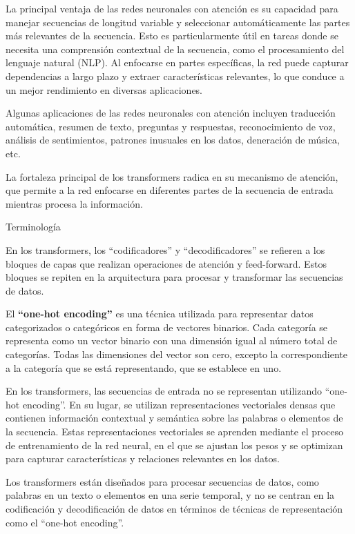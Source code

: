 \documentclass[10pd,hyperref={colorlinks=true}]{beamer}
\begin{document}

 \begin{frame}{}

La principal ventaja de las redes neuronales con atención es su 
capacidad para manejar secuencias de longitud variable y seleccionar 
automáticamente las partes más relevantes de la secuencia. Esto es 
particularmente útil en tareas donde se necesita una comprensión 
contextual de la secuencia, como el procesamiento del lenguaje natural 
(NLP). Al enfocarse en partes específicas, la red puede capturar 
dependencias a largo plazo y extraer características relevantes, lo que 
conduce a un mejor rendimiento en diversas aplicaciones.

Algunas aplicaciones de las redes neuronales con atención incluyen 
traducción automática, resumen de texto, preguntas y respuestas, 
reconocimiento de voz, análisis de sentimientos, patrones inusuales en 
los datos, deneración de música, etc.

La fortaleza principal de los transformers radica en su mecanismo de 
atención, que permite a la red enfocarse en diferentes partes de la 
secuencia de entrada mientras procesa la información. 

 \end{frame}


 \begin{frame}{Terminología}

En los transformers, los ``codificadores'' y ``decodificadores'' se 
refieren a los bloques de capas que realizan operaciones de atención y 
feed-forward. Estos bloques se repiten en la arquitectura para procesar 
y transformar las secuencias de datos.

El {\bf ``one-hot encoding''} es una técnica utilizada para representar datos 
categorizados o categóricos en forma de vectores binarios. Cada 
categoría se representa como un vector binario con una dimensión igual 
al número total de categorías. Todas las dimensiones del vector son 
cero, excepto la correspondiente a la categoría que se está 
representando, que se establece en uno.

En los transformers, las secuencias de entrada no se representan 
utilizando ``one-hot encoding''. En su lugar, se utilizan 
representaciones vectoriales densas que contienen información contextual 
y semántica sobre las palabras o elementos de la secuencia. Estas 
representaciones vectoriales se aprenden mediante el proceso de 
entrenamiento de la red neural, en el que se ajustan los pesos y se 
optimizan para capturar características y relaciones relevantes en los 
datos.

Los transformers están diseñados para procesar secuencias de datos, como 
palabras en un texto o elementos en una serie temporal, y no se centran 
en la codificación y decodificación de datos en términos de técnicas de 
representación como el ``one-hot encoding''.

 \end{frame}
\end{document}
